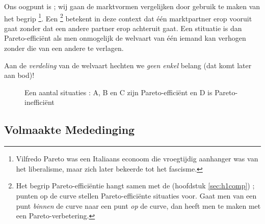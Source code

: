 \par Ons oogpunt is  ; wij gaan de marktvormen vergelijken door gebruik te maken van het begrip \footnote{Vilfredo Pareto was een Italiaans econoom die vroegtijdig aanhanger was van het liberalisme, maar zich later bekeerde tot het fascisme.}. Een \footnote{Het begrip Pareto-effici\"entie hangt samen met de  (hoofdstuk \ref{sec:h1comp}) ; punten op de curve stellen Pareto-effici\"ente situaties voor. Gaat men van een punt \textit{binnen} de curve naar een punt \textit{op} de curve, dan heeft men te maken met een Pareto-verbetering.} betekent in deze context dat \'e\'en marktpartner erop vooruit gaat zonder dat een andere partner erop achteruit gaat. Een stituatie is dan Pareto-effici\"ent als men onmogelijk de welvaart van \'e\'en iemand kan verhogen zonder die van een andere te verlagen.
\par Aan de \textit{verdeling} van de welvaart hechten we \textit{geen enkel} belang (dat komt later aan bod)!

\begin{figure}[H]
\vspace{0.5cm}
\centering
\captionsetup{justification=centering,margin=2cm}
\caption{Een aantal situaties : A, B en C zijn Pareto-effici\"ent en D is Pareto-ineffici\"ent}
\label{fig:h3peff}
\end{figure}

\subsection{Volmaakte Mededinging}

